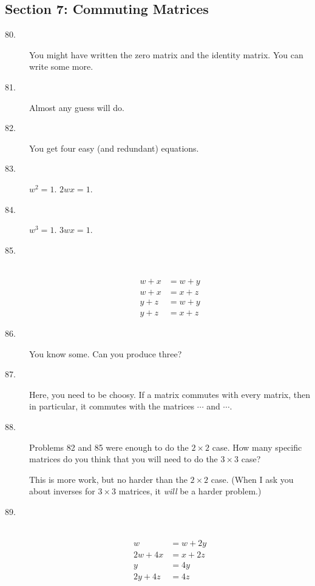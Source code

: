 \documentclass{article}
\begin{document}
\subsection*{Section 7: Commuting Matrices}

\begin{description}

  \item[80.] You might have written the zero matrix and the identity matrix. You can write some more.

  \item[81.] Almost any guess will do.

  \item[82.] You get four easy (and redundant) equations.

  \item[83.] $w^2 = 1$. $2wx = 1$.

  \item[84.] $w^3 = 1$. $3wx = 1$.

  \item[85.] $\ $
    \begin{align*} 
    w + x & = w + y \\
    w + x & = x + z \\ 
    y + z & = w + y \\
    y + z & = x + z
    \end{align*}

  \item[86.] You know some. Can you produce three?

  \item[87.] Here, you need to be choosy. If a matrix commutes with every matrix, then in particular, it commutes with the matrices $\cdots$ and $\cdots$. 

  \item[88.] Problems 82 and 85 were enough to do the $2 \times 2$ case. How many specific matrices do you think that you will need to do the $3 \times 3$ case?

    This is more work, but no harder than the $2 \times 2$ case. (When I ask you about inverses for $3 \times 3$ matrices, it \emph{will} be a harder problem.) 

  \item[89.] $\ $
    \begin{align*}
          w & = w + 2y \\
    2w + 4x & = x + 2z \\ 
          y & = 4y \\
    2y + 4z & = 4z
    \end{align*}


\end{description}
\end{document}

